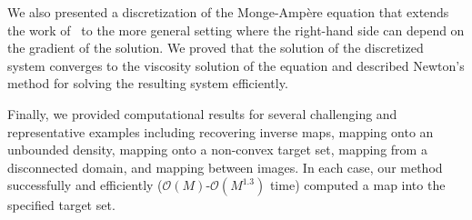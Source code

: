 \documentclass{amsart}
\theoremstyle{lemma}
\theoremstyle{remark}
\begin{document}
We also presented a discretization of the {{Monge-Amp\`ere}\xspace} equation that extends the work of~\cite{FOTheory} to the more general setting where the right-hand side can depend on the gradient of the solution.  We proved that the solution of the discretized system converges to the viscosity solution of the equation and described Newton's method for solving the resulting system efficiently.  

Finally, we provided computational results for several challenging and representative examples including recovering inverse maps, mapping onto an unbounded density, mapping onto a non-convex target set, mapping from a disconnected domain, and mapping between images.  In each case, our method successfully and efficiently (${\mathcal{O}}(M)$-${\mathcal{O}}(M^{1.3})$ time) computed a map into the specified target set.
\end{document}
